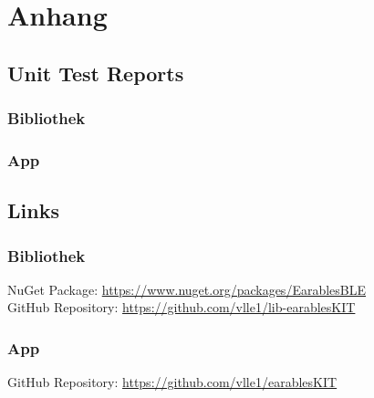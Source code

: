 \documentclass[a4paper,12pt]{article}
\begin{document}
\section{Anhang}
\subsection{Unit Test Reports}
\subsubsection{Bibliothek}
\subsubsection{App}

\subsection{Links}
\subsubsection{Bibliothek}
NuGet Package: \url{https://www.nuget.org/packages/EarablesBLE}\\
GitHub Repository: \url{https://github.com/vlle1/lib-earablesKIT}
\subsubsection{App}
GitHub Repository: \url{https://github.com/vlle1/earablesKIT}


\printglossaries
{}
\end{document}
